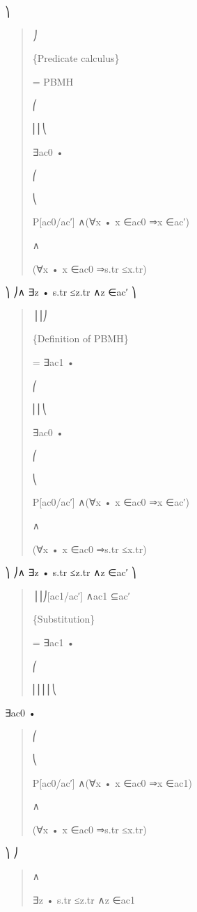\documentclass[11pt]{article}
\begin{document}
⎞

\begin{quote}\small\raggedright
⎠
\par
\{Predicate calculus\}
\par
= PBMH
\par
⎛
\par
⎜⎜⎝
\par
∃ac0 •
\par
⎛
\par
⎝
\par
P[ac0/ac′] ∧(∀x • x ∈ac0 ⇒x ∈ac′)
\par
∧
\par
(∀x • x ∈ac0 ⇒s.tr ≤x.tr)
\end{quote}

⎞ ⎠∧ ∃z • s.tr ≤z.tr ∧z ∈ac′ ⎞

\begin{quote}\small\raggedright
⎟⎟⎠
\par
\{Definition of PBMH\}
\par
= ∃ac1 •
\par
⎛
\par
⎜⎜⎝
\par
∃ac0 •
\par
⎛
\par
⎝
\par
P[ac0/ac′] ∧(∀x • x ∈ac0 ⇒x ∈ac′)
\par
∧
\par
(∀x • x ∈ac0 ⇒s.tr ≤x.tr)
\end{quote}

⎞ ⎠∧ ∃z • s.tr ≤z.tr ∧z ∈ac′ ⎞

\begin{quote}\small\raggedright
⎟⎟⎠[ac1/ac′] ∧ac1 ⊆ac′
\par
\{Substitution\}
\par
= ∃ac1 •
\par
⎛
\par
⎜⎜⎜⎜⎝
\end{quote}

∃ac0 •

\begin{quote}\small\raggedright
⎛
\par
⎝
\par
P[ac0/ac′] ∧(∀x • x ∈ac0 ⇒x ∈ac1)
\par
∧
\par
(∀x • x ∈ac0 ⇒s.tr ≤x.tr)
\end{quote}

⎞ ⎠

\begin{quote}\small\raggedright
∧
\par
∃z • s.tr ≤z.tr ∧z ∈ac1
\end{quote}
\end{document}
